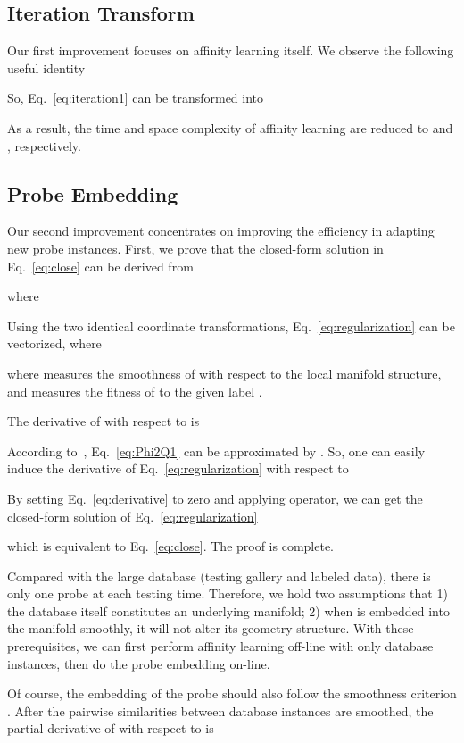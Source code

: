 \documentclass[10pt,twocolumn,letterpaper]{article}
\begin{document}
\subsection{Iteration Transform}
Our first improvement focuses on affinity learning itself. We observe the following useful identity

So, Eq.~\eqref{eq:iteration1} can be transformed into

As a result, the time and space complexity of affinity learning are reduced to  and , respectively.

\subsection{Probe Embedding}
Our second improvement concentrates on improving the efficiency in adapting new probe instances. First, we prove that the closed-form solution in Eq.~\eqref{eq:close} can be derived from

where

Using the two identical coordinate transformations, Eq.~\eqref{eq:regularization} can be vectorized, where

where  measures the smoothness of  with respect to the local manifold structure, and  measures the fitness of  to the given label .

The derivative of  with respect to  is

According to~\cite{belkin2003laplacian}, Eq.~\eqref{eq:Phi2Q1} can be approximated by
.
So, one can easily induce the derivative of Eq.~\eqref{eq:regularization} with respect to 

By setting Eq.~\eqref{eq:derivative} to zero and applying  operator, we can get the closed-form solution of Eq.~\eqref{eq:regularization}

which is equivalent to Eq.~\eqref{eq:close}. The proof is complete.

Compared with the large database (testing gallery and labeled data), there is only one probe  at each testing time. Therefore, we hold two assumptions that 1) the database itself constitutes an underlying manifold; 2) when  is embedded into the manifold smoothly, it will not alter its geometry structure. With these prerequisites, we can first perform affinity learning off-line with only database instances, then do the probe embedding on-line.

Of course, the embedding of the probe should also follow the smoothness criterion .
After the pairwise similarities between database instances are smoothed, the partial derivative of  with respect to  is
\end{document}
